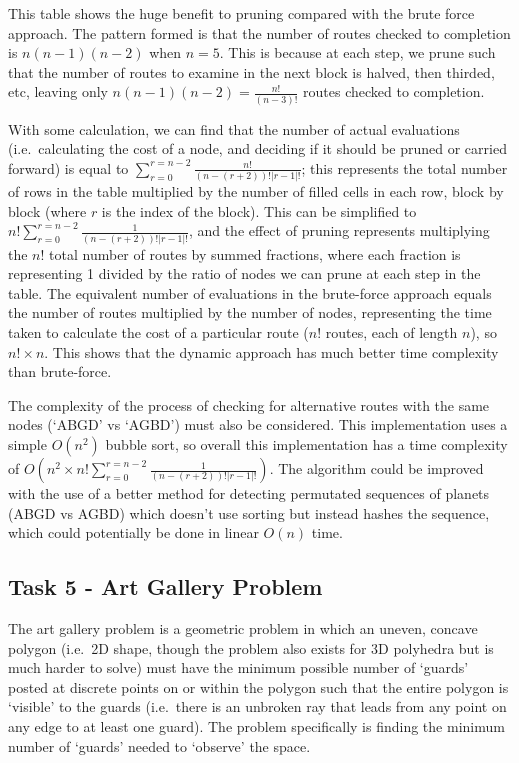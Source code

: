 \documentclass[
]{article}
\begin{document}
This table shows the huge benefit to pruning compared with the brute
force approach. The pattern formed is that the number of routes checked
to completion is \(n(n-1)(n-2)\) when \(n=5\). This is because at each
step, we prune such that the number of routes to examine in the next
block is halved, then thirded, etc, leaving only
\(n(n-1)(n-2)=\frac{n!}{(n-3)!}\) routes checked to completion.

With some calculation, we can find that the number of actual evaluations
(i.e.~calculating the cost of a node, and deciding if it should be
pruned or carried forward) is equal to
\(\sum_{r=0}^{r=n-2} \frac{n!}{(n-(r+2))!|r-1|!}\); this represents the
total number of rows in the table multiplied by the number of filled
cells in each row, block by block (where \(r\) is the index of the
block). This can be simplified to
\(n!\sum_{r=0}^{r=n-2} \frac{1}{(n-(r+2))!|r-1|!}\), and the effect of
pruning represents multiplying the \(n!\) total number of routes by
summed fractions, where each fraction is representing 1 divided by the
ratio of nodes we can prune at each step in the table. The equivalent
number of evaluations in the brute-force approach equals the number of
routes multiplied by the number of nodes, representing the time taken to
calculate the cost of a particular route (\(n!\) routes, each of length
\(n\)), so \(n!\times n\). This shows that the dynamic approach has much
better time complexity than brute-force.

The complexity of the process of checking for alternative routes with
the same nodes (`ABGD' vs `AGBD') must also be considered. This
implementation uses a simple \(O(n^2)\) bubble sort, so overall this
implementation has a time complexity of
\(O(n^2\times n!\sum_{r=0}^{r=n-2} \frac{1}{(n-(r+2))!|r-1|!})\). The
algorithm could be improved with the use of a better method for
detecting permutated sequences of planets (ABGD vs AGBD) which doesn't
use sorting but instead hashes the sequence, which could potentially be
done in linear \(O(n)\) time.

\subsection{Task 5 - Art Gallery
Problem}\label{task-5---art-gallery-problem}

The art gallery problem is a geometric problem in which an uneven,
concave polygon (i.e.~2D shape, though the problem also exists for 3D
polyhedra but is much harder to solve) must have the minimum possible
number of `guards' posted at discrete points on or within the polygon
such that the entire polygon is `visible' to the guards (i.e.~there is
an unbroken ray that leads from any point on any edge to at least one
guard). The problem specifically is finding the minimum number of
`guards' needed to `observe' the space.
\end{document}
